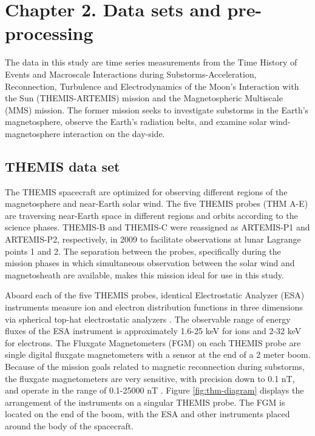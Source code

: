 \chapter{Chapter 2. Data sets and pre-processing}\label{ch:ch2_data}

The data in this study are time series measurements from the Time History of Events and Macroscale Interactions during Substorms-Acceleration, Reconnection, Turbulence and Electrodynamics of the Moon’s Interaction with the Sun (THEMIS-ARTEMIS) mission and the Magnetospheric Multiscale (MMS) mission. The former mission seeks to investigate substorms in the Earth's magnetosphere, observe the Earth's radiation belts, and examine solar wind-magnetosphere interaction on the day-side. 


\section{THEMIS data set}
The THEMIS spacecraft are optimized for observing different regions of the magnetosphere and near-Earth solar wind. The five THEMIS probes (THM A-E) are traversing near-Earth space in different regions and orbits according to the science phases. THEMIS-B and THEMIS-C were reassigned as ARTEMIS-P1 and ARTEMIS-P2, respectively, in 2009 to facilitate observations at lunar Lagrange points 1 and 2. The separation between the probes, specifically during the mission phases in which simultaneous observation between the solar wind and magnetosheath are available, makes this mission ideal for use in this study.

Aboard each of the five THEMIS probes, identical Electrostatic Analyzer (ESA) instruments measure ion and electron distribution functions in three dimensions via spherical top-hat electrostatic analyzers \citep{McFadden:2008}. The observable range of energy fluxes of the ESA instrument is approximately 1.6-25 keV for ions and 2-32 keV for electrons. The Fluxgate Magnetometers (FGM) on each THEMIS probe \citep{Auster:2008} are single digital fluxgate magnetometers with a sensor at the end of a 2 meter boom. Because of the mission goals related to magnetic reconnection during substorms, the fluxgate magnetometers are very sensitive, with precision down to 0.1 nT, and operate in the range of 0.1-25000 nT \citep{Auster:2008}. Figure \ref{fig:thm-diagram} displays the arrangement of the instruments on a singular THEMIS probe. The FGM is located on the end of the boom, with the ESA and other instruments placed around the body of the spacecraft.

